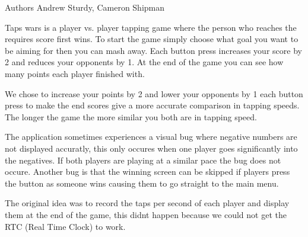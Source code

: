 \begin{DoxyAuthor}{Authors}
Andrew Sturdy, Cameron Shipman
\end{DoxyAuthor}
Taps wars is a player vs. player tapping game where the person who reaches the requires score first wins. To start the game simply choose what goal you want to be aiming for then you can mash away. Each button press increases your score by 2 and reduces your opponents by 1. At the end of the game you can see how many points each player finished with.

We chose to increase your points by 2 and lower your opponents by 1 each button press to make the end scores give a more accurate comparison in tapping speeds. The longer the game the more similar you both are in tapping speed.

The application sometimes experiences a visual bug where negative numbers are not displayed accuratly, this only occures when one player goes significantly into the negatives. If both players are playing at a similar pace the bug does not occure. Another bug is that the winning screen can be skipped if players press the button as someone wins causing them to go straight to the main menu.

The original idea was to record the taps per second of each player and display them at the end of the game, this didnt happen because we could not get the RTC (Real Time Clock) to work. 